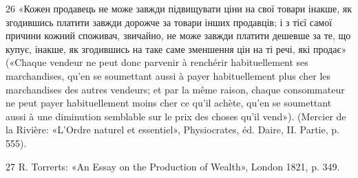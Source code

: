 26 «Кожен продавець не може завжди підвищувати ціни на свої товари
інакше, як згодившись платити завжди дорожче за товари інших продавців;
і з тієї самої причини кожний споживач, звичайно, не може завжди
платити дешевше за те, що купує, інакше, як згодившись на таке саме зменшення
цін на ті речі, які продає» («Chaque vendeur ne peut donc parvenir
à renchérir habituellement ses marchandises, qu’en se soumettant aussi à
payer habituellement plus cher les marchandises des autres vendeurs; et
par la même raison, chaque consommateur ne peut payer habituellement
moins cher ce qu’il achète, qu’en se soumettant aussi à une diminution
semblable sur le prix des choses qu’il vend»). (Mercier de la Rivière:
«L’Ordre naturel et essentiel», Physiocrates, éd. Daire, II. Partie, p. 555).

27  R. Torrerts: «An Essay on the Production of Wealth», London
1821, p. 349.
